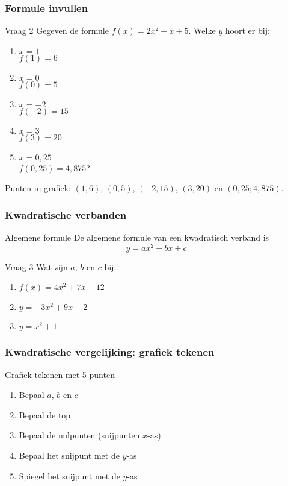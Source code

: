 \begin{frame}
\frametitle{Formule invullen}
\begin{block}{Vraag 2}
Gegeven de formule $f(x) = 2x^2 - x + 5$. Welke $y$ hoort er bij:
\begin{enumerate}
 \item $x = 1$ \\
 $f(1) = 6$
 \item $x = 0$ \\
 $f(0) = 5$
 \item $x = -2$ \\
 $f(-2) = 15$ 
 \item $x = 3$ \\
 $f(3) = 20$
 \item $x = 0,25$  \\
 $f(0,25) = 4,875$?
\end{enumerate}
\end{block}

Punten in grafiek: $(1,6)$, $(0,5)$, $(-2,15)$, $(3,20)$ en $(0,25;4,875)$.
\end{frame}


\begin{frame}
\frametitle{Kwadratische verbanden}
\begin{alertblock}{Algemene formule}
De algemene formule van een kwadratisch verband is 
\[ y = ax^2 + bx + c\]
\end{alertblock}

\begin{block}{Vraag 3}
Wat zijn $a$, $b$ en $c$ bij:
\begin{enumerate}
 \item $f(x) = 4x^2 +7x -12$
 \item $y = -3x^2 +9x + 2$
 \item $ y = x^2 + 1$
\end{enumerate}
\end{block}
\end{frame}

\begin{frame}
\frametitle{Kwadratische vergelijking: grafiek tekenen}
\begin{alertblock}{Grafiek tekenen met 5 punten}
\begin{enumerate}
\item Bepaal $a$, $b$ en $c$
\item Bepaal de top
\item Bepaal de nulpunten (snijpunten $x$-as)
\item Bepaal het snijpunt met de $y$-as
\item Spiegel het snijpunt met de $y$-as
\end{enumerate}
\end{alertblock}
\end{frame}

